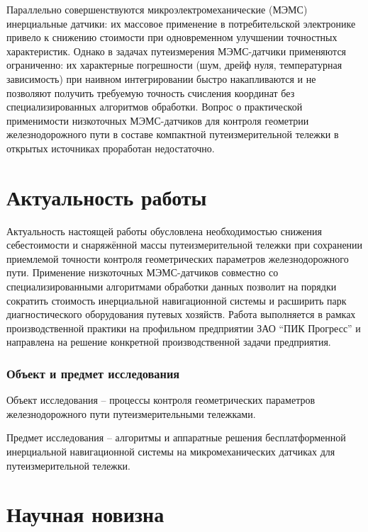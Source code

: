 Параллельно совершенствуются микроэлектромеханические (МЭМС) инерциальные датчики: их массовое применение в потребительской электронике привело к снижению стоимости при одновременном улучшении точностных характеристик. Однако в задачах путеизмерения МЭМС-датчики применяются ограниченно: их характерные погрешности (шум, дрейф нуля, температурная зависимость) при наивном интегрировании быстро накапливаются и не позволяют получить требуемую точность счисления координат без специализированных алгоритмов обработки. Вопрос о практической применимости низкоточных МЭМС-датчиков для контроля геометрии железнодорожного пути в составе компактной путеизмерительной тележки в открытых источниках проработан недостаточно.

\section*{Актуальность работы}

Актуальность настоящей работы обусловлена необходимостью снижения себестоимости и снаряжённой массы путеизмерительной тележки при сохранении приемлемой точности контроля геометрических параметров железнодорожного пути. Применение низкоточных МЭМС-датчиков совместно со специализированными алгоритмами обработки данных позволит на порядки сократить стоимость инерциальной навигационной системы и расширить парк диагностического оборудования путевых хозяйств. Работа выполняется в рамках производственной практики на профильном предприятии ЗАО \enquote{ПИК Прогресс} и направлена на решение конкретной производственной задачи предприятия.

\subsubsection*{Объект и предмет исследования}

Объект исследования -- процессы контроля геометрических параметров железнодорожного пути путеизмерительными тележками.

Предмет исследования -- алгоритмы и аппаратные решения бесплатформенной инерциальной навигационной системы на микромеханических датчиках для путеизмерительной тележки.

\section*{Научная новизна}

